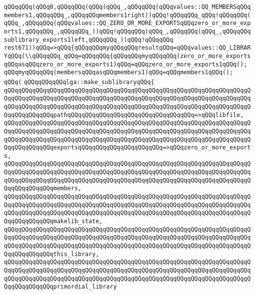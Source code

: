 \verb|qQQqqQQq(qQQq0,qQQqqQQq(qQQq(qQQq_,qQQqqQQq(qQQqvalues::QQ_MEMBERSqQQqmembers1,qQQqqQQq_,qQQqqQQqmembers1right))qQQq!qQQqqQQq_qQQq!qQQqqQQq(qQQq_,qQQqqQQq(qQQqvalues::QQ_ZERO_OR_MORE_EXPORTSqQQqzero_or_more_exports1,qQQqqQQq_,qQQqqQQq_))qQQq!qQQqqQQq(qQQq_,qQQqqQQq(qQQq_,qQQqqQQqsublibrary_exports1left,qQQqqQQq_))qQQq!qQQqqQQq|\newline
\verb|rest671))qQQq=>qQQq{qQQqqQQqmyqQQqqQQqresultqQQq=qQQqvalues::QQ_LIBRARYqQQq(\\qQQqqQQq_qQQq=qQQqqQQq{qQQqqQQqmyqQQqqQQq(zero_or_more_exportsqQQqasqQQqzero_or_more_exports1)qQQq=qQQqzero_or_more_exports1qQQq();|\newline
\verb|qQQqmyqQQqqQQq(membersqQQqasqQQqmembers1)qQQq=qQQqmembers1qQQq();|\newline
\verb|qQQq(|\newline
\verb|qQQqqQQqqQQqlga::make_sublibraryqQQq{|\newline
\verb|qQQqqQQqqQQqqQQqqQQqqQQqqQQqqQQqqQQqqQQqqQQqqQQqqQQqqQQqqQQqqQQqqQQqqQQqqQQqqQQqqQQqqQQqqQQqqQQqqQQqqQQqqQQqqQQqqQQqqQQqqQQqqQQqqQQqqQQqqQQqqQQqqQQqqQQqqQQqqQQqqQQqqQQqqQQqqQQqqQQqqQQqqQQqqQQqqQQqqQQqqQQqqQQqqQQqqQQqqQQqqQQqpathqQQqqQQqqQQqqQQqqQQqqQQqqQQqqQQqqQQq=>qQQqlibfile,|\newline
\verb|qQQqqQQqqQQqqQQqqQQqqQQqqQQqqQQqqQQqqQQqqQQqqQQqqQQqqQQqqQQqqQQqqQQqqQQqqQQqqQQqqQQqqQQqqQQqqQQqqQQqqQQqqQQqqQQqqQQqqQQqqQQqqQQqqQQqqQQqqQQqqQQqqQQqqQQqqQQqqQQqqQQqqQQqqQQqqQQqqQQqqQQqqQQqqQQqqQQqqQQqqQQqqQQqqQQqqQQqqQQqqQQqexportsqQQqqQQqqQQqqQQqqQQqqQQq=>qQQqzero_or_more_exports,|\newline
\verb|qQQqqQQqqQQqqQQqqQQqqQQqqQQqqQQqqQQqqQQqqQQqqQQqqQQqqQQqqQQqqQQqqQQqqQQqqQQqqQQqqQQqqQQqqQQqqQQqqQQqqQQqqQQqqQQqqQQqqQQqqQQqqQQqqQQqqQQqqQQqqQQqqQQqqQQqqQQqqQQqqQQqqQQqqQQqqQQqqQQqqQQqqQQqqQQqqQQqqQQqqQQqqQQqqQQqqQQqqQQqqQQqmembers,|\newline
\verb|qQQqqQQqqQQqqQQqqQQqqQQqqQQqqQQqqQQqqQQqqQQqqQQqqQQqqQQqqQQqqQQqqQQqqQQqqQQqqQQqqQQqqQQqqQQqqQQqqQQqqQQqqQQqqQQqqQQqqQQqqQQqqQQqqQQqqQQqqQQqqQQqqQQqqQQqqQQqqQQqqQQqqQQqqQQqqQQqqQQqqQQqqQQqqQQqqQQqqQQqqQQqqQQqqQQqqQQqqQQqqQQqmakelib_state,|\newline
\verb|qQQqqQQqqQQqqQQqqQQqqQQqqQQqqQQqqQQqqQQqqQQqqQQqqQQqqQQqqQQqqQQqqQQqqQQqqQQqqQQqqQQqqQQqqQQqqQQqqQQqqQQqqQQqqQQqqQQqqQQqqQQqqQQqqQQqqQQqqQQqqQQqqQQqqQQqqQQqqQQqqQQqqQQqqQQqqQQqqQQqqQQqqQQqqQQqqQQqqQQqqQQqqQQqqQQqqQQqqQQqqQQqthis_library,|\newline
\verb|qQQqqQQqqQQqqQQqqQQqqQQqqQQqqQQqqQQqqQQqqQQqqQQqqQQqqQQqqQQqqQQqqQQqqQQqqQQqqQQqqQQqqQQqqQQqqQQqqQQqqQQqqQQqqQQqqQQqqQQqqQQqqQQqqQQqqQQqqQQqqQQqqQQqqQQqqQQqqQQqqQQqqQQqqQQqqQQqqQQqqQQqqQQqqQQqqQQqqQQqqQQqqQQqqQQqqQQqqQQqqQQqprimordial_library|\newline

